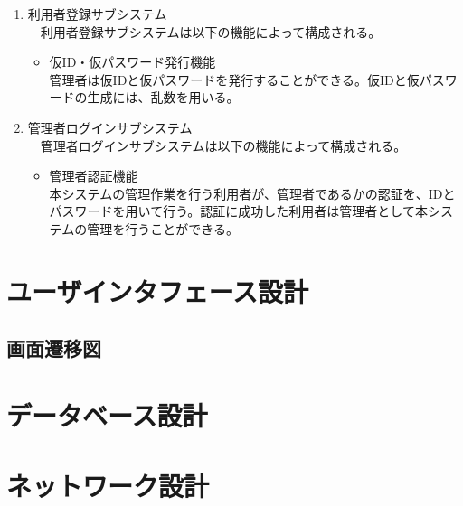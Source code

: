 \documentclass[a4j]{jarticle}
\begin{document}
\begin{enumerate}
  \item 利用者登録サブシステム\\
  　利用者登録サブシステムは以下の機能によって構成される。
  \begin{itemize}
    \item 仮ID・仮パスワード発行機能\\
    管理者は仮IDと仮パスワードを発行することができる。仮IDと仮パスワードの生成には、乱数を用いる。\\
  \end{itemize}


  \item 管理者ログインサブシステム\\
  　管理者ログインサブシステムは以下の機能によって構成される。
  \begin{itemize}
    \item 管理者認証機能\\
    本システムの管理作業を行う利用者が、管理者であるかの認証を、IDとパスワードを用いて行う。認証に成功した利用者は管理者として本システムの管理を行うことができる。
  \end{itemize}

\end{enumerate}



\section{ユーザインタフェース設計}

\subsection{画面遷移図}


\section{データベース設計}


\section{ネットワーク設計}






\begin{thebibliography}{10}



\end{thebibliography}
\end{document}
